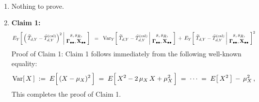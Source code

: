 \proof
\begin{enumerate}
\item
    Nothing to prove.
\item
    \textbf{Claim 1:}\quad
    \begin{equation*}
    E_{Y}\!\left[\,
        \left(\,\widetilde{T}_{d,Y} - \widehat{T}^{\textnormal{(cal)}}_{d,Y}\right)^{2}
        \left\vert\!
        \begin{array}{c} s,s_{R}, \\ \Gdotdot,\Xobs \end{array}
        \right.
        \!\!\right]
    \;\; = \;\;
        \Var_{Y}\!\left[\;
            \widetilde{T}_{d,Y} - \widehat{T}^{\textnormal{(cal)}}_{d,Y}
            \left\vert\!
            \begin{array}{c} s,s_{R}, \\ \Gdotdot,\Xobs \end{array}
            \right.
            \!\!\right]
        \,+\,
        E_{Y}\!\left[\;
            \widetilde{T}_{d,Y} - \widehat{T}^{\textnormal{(cal)}}_{d,Y}
            \left\vert\!
            \begin{array}{c} s,s_{R}, \\ \Gdotdot,\Xobs \end{array}
            \right.
            \!\!\right]^{2}
    \end{equation*}
    \vskip 0.1cm
    \noindent
    Proof of Claim 1:\;\;
    Claim 1 follows immediately from the following well-known equality:
    \begin{equation*}
    \Var[\,X\,]
    \; := \;
        E\!\left[\,\overset{{\color{white}.}}{(X - \mu_{X})^{2}}\,\right]
    \; = \;
        E\!\left[\,\overset{{\color{white}.}}{X^{2} - 2\,\mu_{X}\,X + \mu_{X}^{2}}\,\right]
    \; = \;
        \cdots
    \; = \;
        E\!\left[\,X^{2}\,\right] \,-\, \mu_{X}^{2}\,,
    \end{equation*}
    This completes the proof of Claim 1.


\end{enumerate}
